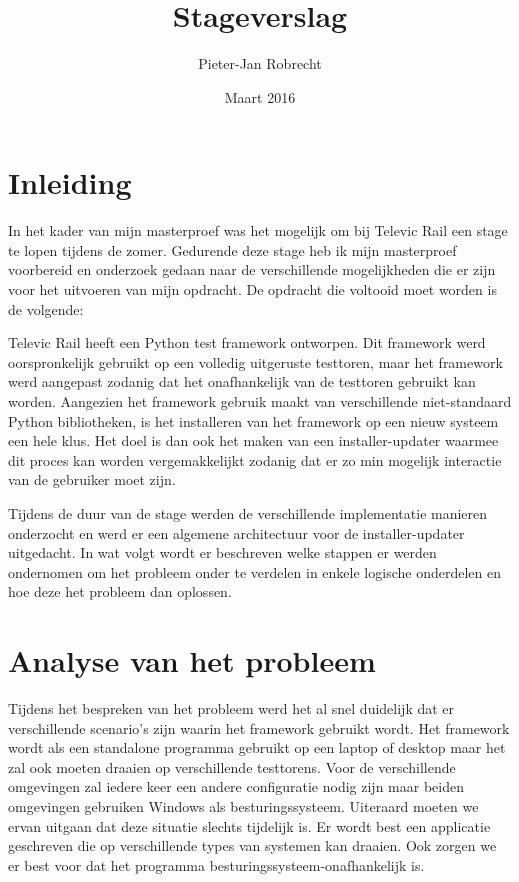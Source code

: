 \documentclass{article}
\title{Stageverslag}
\author{\mbox{Pieter-Jan} Robrecht}
\date{Maart 2016}
\begin{document}


\clearpage
\setcounter{page}{1}

\tableofcontents

\section{Inleiding}
In het kader van mijn masterproef was het mogelijk om bij Televic Rail een stage te lopen tijdens de zomer. 
Gedurende deze stage heb ik mijn masterproef voorbereid en onderzoek gedaan naar de verschillende mogelijkheden die er zijn voor het uitvoeren van mijn opdracht.
De opdracht die voltooid moet worden is de volgende:

\begin{displayquote}
Televic Rail heeft een Python test framework ontworpen. 
Dit framework werd oorspronkelijk gebruikt op een volledig uitgeruste testtoren, maar het framework werd aangepast zodanig dat het onafhankelijk van de testtoren gebruikt kan worden.
Aangezien het framework gebruik maakt van verschillende niet-standaard Python bibliotheken, is het installeren van het framework op een nieuw systeem een hele klus.
Het doel is dan ook het maken van een installer-updater waarmee dit proces kan worden vergemakkelijkt zodanig dat er zo min mogelijk interactie van de gebruiker moet zijn.
\end{displayquote}

Tijdens de duur van de stage werden de verschillende implementatie manieren onderzocht en werd er een algemene architectuur voor de installer-updater uitgedacht.
In wat volgt wordt er beschreven welke stappen er werden ondernomen om het probleem onder te verdelen in enkele logische onderdelen en hoe deze het probleem dan oplossen. 

\section{Analyse van het probleem}\label{section:analyse}
Tijdens het bespreken van het probleem werd het al snel duidelijk dat er verschillende scenario's zijn waarin het framework gebruikt wordt. 
Het framework wordt als een standalone programma gebruikt op een laptop of desktop maar het zal ook moeten draaien op verschillende testtorens. 
Voor de verschillende omgevingen zal iedere keer een andere configuratie nodig zijn maar beiden omgevingen gebruiken Windows als besturingssysteem.
Uiteraard moeten we ervan uitgaan dat deze situatie slechts tijdelijk is.
Er wordt best een applicatie geschreven die op verschillende types van systemen kan draaien.
Ook zorgen we er best voor dat het programma besturingssysteem-onafhankelijk is.
\end{document}

